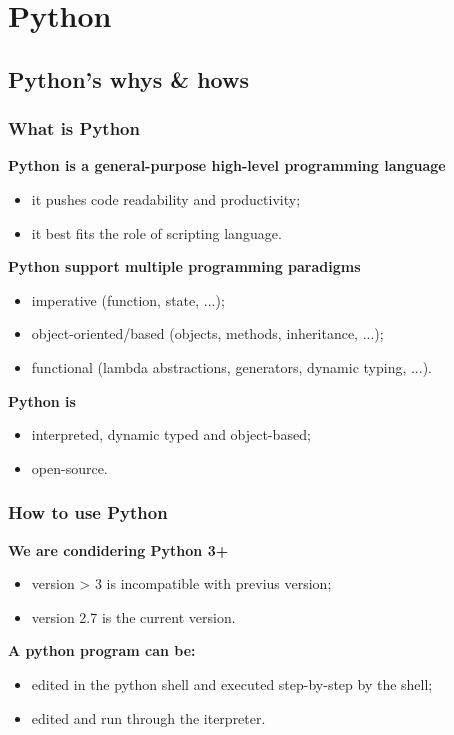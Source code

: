 \section{Python}

\subsection{Python's whys \& hows}

\subsubsection{What is Python}
\textbf{Python is a general-purpose high-level programming language}
\begin{itemize}
	\item it pushes code readability and productivity;
	\item it best fits the role of scripting language.
	\end{itemize}
\textbf{Python support multiple programming paradigms}
\begin{itemize}
	\item imperative (function, state, ...);
	\item object-oriented/based (objects, methods, inheritance, ...);
	\item functional (lambda abstractions, generators, dynamic typing, ...).
\end{itemize}
\textbf{Python is}
\begin{itemize}
	\item interpreted, dynamic typed and object-based;
	\item open-source.
\end{itemize}

\subsubsection{How to use Python}	
\textbf{We are condidering Python 3+}
\begin{itemize}
	\item version > 3 is incompatible with previus version;
	\item version 2.7 is the current version.
\end{itemize}
\textbf{A python program can be:}
\begin{itemize}
	\item edited in the python shell and executed step-by-step by the shell;
	\item edited and run through the iterpreter.
\end{itemize}


